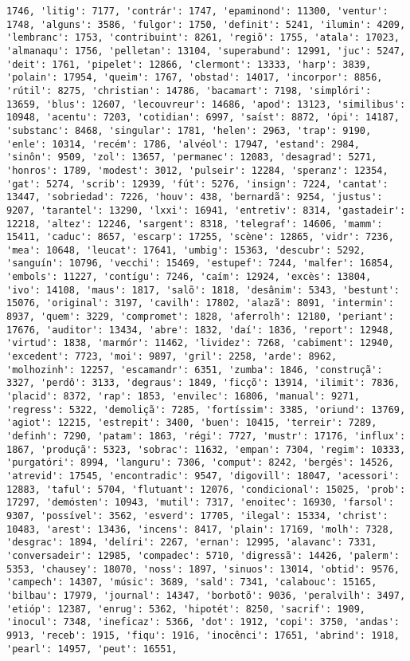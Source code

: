\begin{Verbatim}[commandchars=\\\{\}]
1746, 'litig': 7177, 'contrár': 1747, 'epaminond': 11300, 'ventur': 1748, 'alguns': 3586, 'fulgor': 1750, 'definit': 5241, 'ilumin': 4209, 'lembranc': 1753, 'contribuint': 8261, 'regiõ': 1755, 'atala': 17023, 'almanaqu': 1756, 'pelletan': 13104, 'superabund': 12991, 'juc': 5247, 'deit': 1761, 'pipelet': 12866, 'clermont': 13333, 'harp': 3839, 'polain': 17954, 'queim': 1767, 'obstad': 14017, 'incorpor': 8856, 'rútil': 8275, 'christian': 14786, 'bacamart': 7198, 'simplóri': 13659, 'blus': 12607, 'lecouvreur': 14686, 'apod': 13123, 'similibus': 10948, 'acentu': 7203, 'cotidian': 6997, 'saíst': 8872, 'ópi': 14187, 'substanc': 8468, 'singular': 1781, 'helen': 2963, 'trap': 9190, 'enle': 10314, 'recém': 1786, 'alvéol': 17947, 'estand': 2984, 'sinôn': 9509, 'zol': 13657, 'permanec': 12083, 'desagrad': 5271, 'honros': 1789, 'modest': 3012, 'pulseir': 12284, 'speranz': 12354, 'gat': 5274, 'scrib': 12939, 'fút': 5276, 'insign': 7224, 'cantat': 13447, 'sobriedad': 7226, 'houv': 438, 'bernardã': 9254, 'justus': 9207, 'tarantel': 13290, 'lxxi': 16941, 'entretiv': 8314, 'gastadeir': 12218, 'altez': 12246, 'sargent': 8318, 'telegraf': 14606, 'mamm': 15411, 'caduc': 8657, 'escarp': 17255, 'scène': 12865, 'vidr': 7236, 'mea': 10648, 'leucat': 17641, 'umbig': 15363, 'descubr': 5292, 'sanguín': 10796, 'vecchi': 15469, 'estupef': 7244, 'malfer': 16854, 'embols': 11227, 'contígu': 7246, 'caím': 12924, 'excès': 13804, 'ivo': 14108, 'maus': 1817, 'salõ': 1818, 'desânim': 5343, 'bestunt': 15076, 'original': 3197, 'cavilh': 17802, 'alazã': 8091, 'intermin': 8937, 'quem': 3229, 'compromet': 1828, 'aferrolh': 12180, 'periant': 17676, 'auditor': 13434, 'abre': 1832, 'daí': 1836, 'report': 12948, 'virtud': 1838, 'marmór': 11462, 'lividez': 7268, 'cabiment': 12940, 'excedent': 7723, 'moi': 9897, 'gril': 2258, 'arde': 8962, 'molhozinh': 12257, 'escamandr': 6351, 'zumba': 1846, 'construçã': 3327, 'perdô': 3133, 'degraus': 1849, 'ficçõ': 13914, 'ilimit': 7836, 'placid': 8372, 'rap': 1853, 'envilec': 16806, 'manual': 9271, 'regress': 5322, 'demoliçã': 7285, 'fortíssim': 3385, 'oriund': 13769, 'agiot': 12215, 'estrepit': 3400, 'buen': 10415, 'terreir': 7289, 'definh': 7290, 'patam': 1863, 'régi': 7727, 'mustr': 17176, 'influx': 1867, 'produçã': 5323, 'sobrac': 11632, 'empan': 7304, 'regim': 10333, 'purgatóri': 8994, 'languru': 7306, 'comput': 8242, 'bergés': 14526, 'atrevid': 17545, 'encontradic': 9547, 'digovill': 18047, 'acessori': 12883, 'taful': 5704, 'flutuant': 12076, 'condicional': 15025, 'prob': 17297, 'demósten': 10943, 'mutil': 7317, 'enoitec': 16930, 'farsol': 9307, 'possível': 3562, 'esverd': 17705, 'ilegal': 15334, 'christ': 10483, 'arest': 13436, 'incens': 8417, 'plain': 17169, 'molh': 7328, 'desgrac': 1894, 'delíri': 2267, 'ernan': 12995, 'alavanc': 7331, 'conversadeir': 12985, 'compadec': 5710, 'digressã': 14426, 'palerm': 5353, 'chausey': 18070, 'noss': 1897, 'sinuos': 13014, 'obtid': 9576, 'campech': 14307, 'músic': 3689, 'sald': 7341, 'calabouc': 15165, 'bilbau': 17979, 'journal': 14347, 'borbotõ': 9036, 'peralvilh': 3497, 'etióp': 12387, 'enrug': 5362, 'hipotét': 8250, 'sacrif': 1909, 'inocul': 7348, 'ineficaz': 5366, 'dot': 1912, 'copi': 3750, 'andas': 9913, 'receb': 1915, 'fiqu': 1916, 'inocênci': 17651, 'abrind': 1918, 'pearl': 14957, 'peut': 16551, 
\end{Verbatim}
